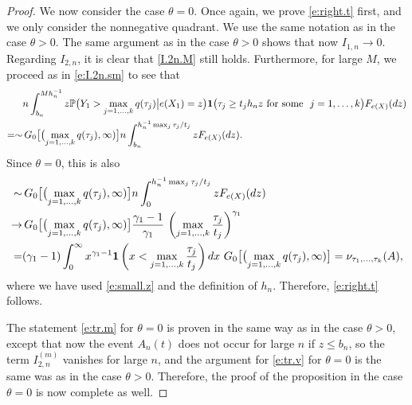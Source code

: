 \documentclass[12pt]{amsart}
\newcommand{\LFe}{F_{e(X)}}
\newcommand{\1}{\mathbbm{1}}
\newcommand{\0}{\mathbf{0}}
\newcommand{\one}{\mathbf{1}}
\theoremstyle{plain}
\theoremstyle{definition}
\newcommand{\bbP}{\mathbb{P}}
\begin{document}
\begin{proof}
We now consider the case $\theta =0$. Once again, we prove
\eqref{e:right.t} first, and we only consider the nonnegative
quadrant. We use the same notation as in the case $\theta>0$. The same
argument as in the case $\theta>0$ shows that now $I_{1,n}\to
0$. Regarding $I_{2,n}$, it is clear that \eqref{I.2n.M} still holds. 
 Furthermore, for large $M$, we proceed as in \eqref{e:I.2n.sm} to see that 
\begin{align*}  
  &n \int_{b_n}^{Mh_n^{-1}}  z\bbP\bigl(   Y_1> \max_{j=1,\ldots, k} q(\tau_j)
          \big| e(X_1)=z\bigr) \one \bigl( \tau_j\geq t_jh_nz \
          \text{for some} \ \ j=1,\ldots, k\bigr) \LFe(dz)   \\
\notag =\sim& \, G_0\bigl[\bigl( \max_{j=1,\ldots, k} q(\tau_j),
               \infty)\bigr] n \int_{b_n}^{h_n^{-1}\max_j
          \tau_j/t_j}z \LFe(dz). 
\end{align*}    
Since $\theta=0$, this is also 
 \begin{align*} \label{e:I.2n.sm0}         
   \sim& \, G_0\bigl[\bigl( \max_{j=1,\ldots, k} q(\tau_j),
               \infty)\bigr] n \int_{0}^{h_n^{-1}\max_j
          \tau_j/t_j}z \LFe(dz) \\
\notag \to&\, G_0\bigl[\bigl( \max_{j=1,\ldots, k} q(\tau_j),
               \infty)\bigr] \frac{\gamma_1-1}{\gamma_1} \, 
  \left(\max_{j=1,\ldots, k}
            \frac{\tau_j}{t_j}\right)^{\gamma_1}  \\
  \notag =&   (\gamma_1-1)
\int_0^{\infty}  x^{\gamma_1-1} \one\left( x<\max_{j=1,\ldots,
            k}\frac{\tau_j}{t_j}\right) dx  \   G_0\bigl[\bigl( \max_{j=1,\ldots, k} q(\tau_j),
               \infty)\bigr] = \nu_{\tau_1,\ldots,\tau_k}(A), 
\end{align*}
%
where we have used  \eqref{e:small.z}  and the definition of $h_n$. Therefore, \eqref{e:right.t} follows.

The statement \eqref{e:tr.m} 
for $\theta=0$ is proven in the same way as in the case $\theta>0$, except that now the event $A_n(t)$ does not occur for large $n$ if $z\leq b_n$, so the term $I_{2,n}^{(m)}$ vanishes for large $n$, and the argument for 
\eqref{e:tr.v} for $\theta=0$ is the same was as
in the case $\theta>0$. Therefore, the proof of the proposition in the
case $\theta=0$ is now complete as well. 


\end{proof}
\end{document}
